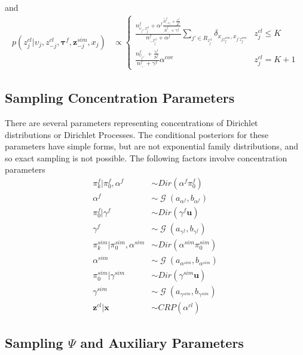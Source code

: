 \documentclass[12pt]{article}
\DeclareMathOperator{\Gamm}{\mathcal{G}}
\begin{document}
and
\begin{align}
p(z^{cl}_{j} \vert \upsilon_j, z^{cl}_{-j}, \boldsymbol{\tau}^f, \mathbf{z}^{sim}_{-j}, x_{j}) &\propto
  \begin{cases}
    \frac{n^f_{\upsilon_j,z^{cl}_j} + \alpha^f \frac{\hat{n}^f_{\cdot,\upsilon_j} + \frac{\gamma^f}{S^f}}{\hat{n}^f_{\cdot,\cdot} + \gamma^f}}{n^f_{\cdot,z^{cl}_j} + \alpha^f} \sum_{j' \in R_{z^{cl}_j}} \delta_{x_{jz^{sim}_{j'}},x_{j'z^{sim}_{j'}}} & z^{cl}_{j} \leq K \\
    \frac{n^f_{\upsilon_j,\cdot} + \frac{\gamma^f}{S^f}}{n^f_{\cdot,\cdot} + \gamma^f} \alpha^{cov} & z^{cl}_{j} = K+1
  \end{cases}
\end{align}

\subsection{Sampling Concentration Parameters}
There are several parameters representing concentrations of Dirichlet distributions or Dirichlet Processes.  The conditional posteriors for these parameters have simple forms, but are not exponential family distributions, and so exact sampling is not possible.  The following factors involve concentration parameters
\begin{align}
  \label{eq:12}
  \pi^f_k \vert \pi^f_0, \alpha^f &\sim Dir(\alpha^f \pi^f_0) \\
  \alpha^f &\sim \Gamm(a_{\alpha^f}, b_{\alpha^f}) \\
  \pi^f_0 \vert \gamma^f &\sim Dir(\gamma^f \mathbf{u}) \\
  \gamma^f &\sim \Gamm(a_{\gamma^f}, b_{\gamma^f}) \\
  \pi^{sim}_k \vert \pi^{sim}_0, \alpha^{sim} &\sim Dir(\alpha^{sim} \pi^{sim}_0) \\
  \alpha^{sim} &\sim \Gamm(a_{\alpha^{sim}}, b_{\alpha^{sim}}) \\
  \pi^{sim}_0 \vert \gamma^{sim} &\sim Dir(\gamma^{sim} \mathbf{u}) \\
  \gamma^{sim} &\sim \Gamm(a_{\gamma^{sim}}, b_{\gamma^{sim}}) \\
  \mathbf{z}^{cl} \vert \mathbf{x} &\sim CRP(\alpha^{cl})
\end{align}

\subsection{Sampling $\Psi$ and Auxiliary Parameters}
\label{sec:gibbs-sampler-psi}
\end{document}
